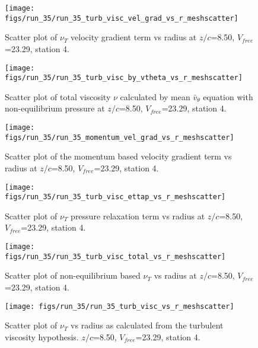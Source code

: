 \begin{figure}[H]
\centering
\texttt{[image: figs/run\_35/run\_35\_turb\_visc\_vel\_grad\_vs\_r\_meshscatter]}
\caption{Scatter plot of $\nu_T$ velocity gradient term vs radius at $z/c$=8.50, $V_{free}$=23.29, station 4.}
\end{figure}


\begin{figure}[H]
\centering
\texttt{[image: figs/run\_35/run\_35\_turb\_visc\_by\_vtheta\_vs\_r\_meshscatter]}
\caption{Scatter plot of total viscosity $\nu$ calculated by mean $\bar{v}_{\theta}$ equation with non-equilibrium pressure at $z/c$=8.50, $V_{free}$=23.29, station 4.}
\end{figure}


\begin{figure}[H]
\centering
\texttt{[image: figs/run\_35/run\_35\_momentum\_vel\_grad\_vs\_r\_meshscatter]}
\caption{Scatter plot of the momentum based velocity gradient term vs radius at $z/c$=8.50, $V_{free}$=23.29, station 4.}
\end{figure}


\begin{figure}[H]
\centering
\texttt{[image: figs/run\_35/run\_35\_turb\_visc\_ettap\_vs\_r\_meshscatter]}
\caption{Scatter plot of $\nu_T$ pressure relaxation term vs radius at $z/c$=8.50, $V_{free}$=23.29, station 4.}
\end{figure}


\begin{figure}[H]
\centering
\texttt{[image: figs/run\_35/run\_35\_turb\_visc\_total\_vs\_r\_meshscatter]}
\caption{Scatter plot of non-equilibrium based $\nu_T$ vs radius at $z/c$=8.50, $V_{free}$=23.29, station 4.}
\end{figure}


\begin{figure}[H]
\centering
\texttt{[image: figs/run\_35/run\_35\_turb\_visc\_vs\_r\_meshscatter]}
\caption{Scatter plot of $\nu_T$ vs radius as calculated from the turbulent viscosity hypothesis. $z/c$=8.50, $V_{free}$=23.29, station 4.}
\end{figure}


